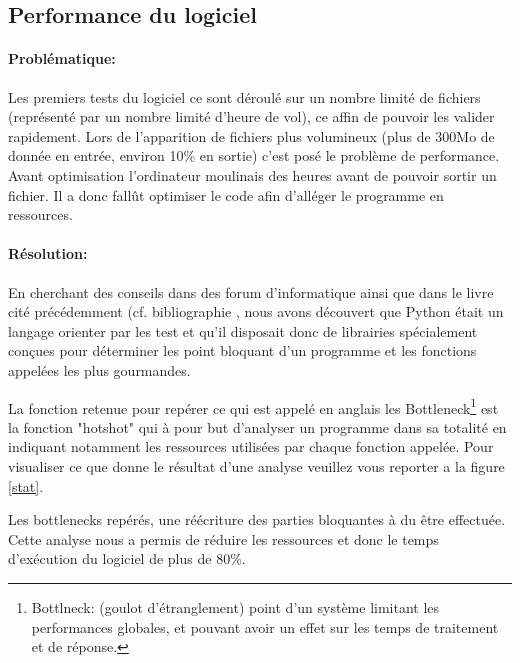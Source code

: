     \subsection{Performance du logiciel\label{perf}}
            \paragraph{Problématique:}
Les premiers tests du logiciel ce sont déroulé sur un nombre limité de fichiers (représenté par un nombre limité d'heure de vol), ce affin de pouvoir les valider rapidement. Lors de l'apparition de fichiers plus volumineux (plus de 300Mo de donnée en entrée, environ 10\% en sortie) c'est posé le problème de performance. Avant optimisation l'ordinateur moulinais des heures avant de pouvoir sortir un fichier. Il a donc fallût optimiser le code afin d'alléger le programme en ressources.

            \paragraph{Résolution:}
En cherchant des conseils dans des forum d'informatique ainsi que dans le livre cité précédemment (cf. bibliographie \cite{pybook}, nous avons découvert que Python était un langage orienter par les test et qu'il disposait donc de librairies spécialement conçues pour déterminer les point bloquant d'un programme et les fonctions appelées les plus gourmandes.

La fonction retenue pour repérer ce qui est appelé en anglais les Bottleneck\footnote{Bottlneck: (goulot d'étranglement) point d'un système limitant les performances globales, et pouvant avoir un effet sur les temps de traitement et de réponse.} est la fonction "hotshot" qui à pour but d'analyser un programme dans sa totalité en indiquant notamment les ressources utilisées par chaque fonction appelée. Pour visualiser ce que donne le résultat d'une analyse veuillez vous reporter a la figure \vref{stat}.

Les bottlenecks repérés, une réécriture des parties bloquantes à du être effectuée. Cette analyse nous a permis de réduire les ressources et donc le temps d'exécution du logiciel de plus de 80\%.
